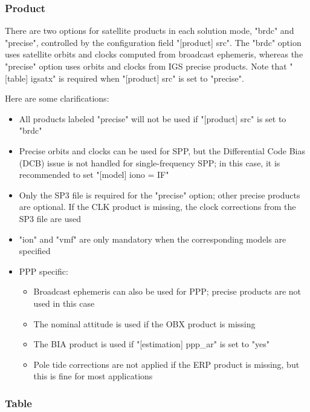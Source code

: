 \subsubsection{Product}
\label{sec:input_product}

There are two options for satellite products in each solution mode, "brdc" and "precise",
controlled by the configuration field "[product] src".
The "brdc" option uses satellite orbits and clocks computed from broadcast ephemeris,
whereas the "precise" option uses orbits and clocks from IGS precise products.
Note that "[table] igsatx" is required when "[product] src" is set to "precise".

Here are some clarifications:

\begin{itemize}[]
    \item All products labeled "precise" will not be used if "[product] src" is set to "brdc"
    \item Precise orbits and clocks can be used for SPP, but the Differential Code Bias (DCB)
          issue is not handled for single-frequency SPP; in this case, it is recommended to set
          "[model] iono = IF"
    \item Only the SP3 file is required for the "precise" option; other precise products are
          optional. If the CLK product is missing, the clock corrections from the SP3 file are used
    \item "ion" and "vmf" are only mandatory when the corresponding models are specified
    \item PPP specific:
    \begin{itemize}[noitemsep]
        \item Broadcast ephemeris can also be used for PPP;
              precise products are not used in this case
        \item The nominal attitude is used if the OBX product is missing
        \item The BIA product is used if "[estimation] ppp\_ar" is set to "yes"
        \item Pole tide corrections are not applied if the ERP product is missing,
              but this is fine for most applications
    \end{itemize}
\end{itemize}



\subsubsection{Table}
\label{sec:input_table}

